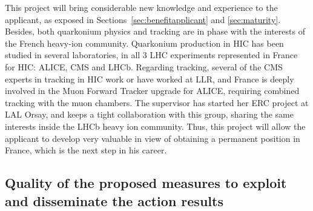 \documentclass[a4paper,11pt]{article}
\begin{document}
This project will bring considerable new knowledge and experience to the applicant, as exposed in Sections~\ref{sec:benefitapplicant} and \ref{sec:maturity}. Besides, both quarkonium physics and tracking are in phase with the interests of the French heavy-ion community. Quarkonium production in HIC has been studied in several laboratories, in all 3 LHC experiments represented in France for HIC: ALICE, CMS and LHCb. Regarding tracking, several of the CMS experts in tracking in HIC work or have worked at LLR, and France is deeply involved in the Muon Forward Tracker upgrade for ALICE, requiring combined tracking with the muon chambers. The supervisor has started her ERC project at LAL Orsay, and keeps a tight collaboration with this group, sharing the same interests inside the LHCb heavy ion community. Thus, this project will allow the applicant to develop very valuable in view of obtaining a permanent position in France, which is the next step in his career.



%                

\subsection{Quality of the proposed measures to exploit and disseminate the action results }

% 
\end{document}
